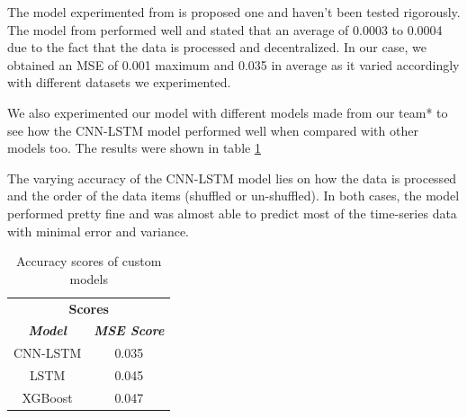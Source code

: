 \documentclass[conference]{IEEEtran}
\begin{document}
The model experimented from \cite{b3} is proposed one and haven't been tested rigorously. The model from \cite{b9} performed well and stated that an average of 0.0003 to 0.0004 due to the fact that the data is processed and decentralized. In our case, we obtained an MSE of 0.001 maximum and 0.035 in average as it varied accordingly with different datasets we experimented.

We also experimented our model with different models made from our team* to see how the CNN-LSTM model performed well when compared with other models too. The results were shown in table \ref{tab2}

The varying accuracy of the CNN-LSTM model lies on how the data is processed and the order of the data items (shuffled or un-shuffled). In both cases, the model performed pretty fine and was almost able to predict most of the time-series data with minimal error and variance.

\begin{table}[htbp]
	\caption{Accuracy scores of custom models}
	\begin{center}
		\begin{tabular}{|c|c|}
			\hline
			\multicolumn{2}{|c|}{\textbf{Scores}} \\
			\cline{1-2} 
			\textbf{\textit{Model}}& \textbf{\textit{MSE Score}} \\
			\hline
			CNN-LSTM & 0.035 \\
			\hline
			LSTM & 0.045 \\
			\hline
			XGBoost & 0.047 \\
			\hline
		\end{tabular}
		\label{tab2}
	\end{center}
\end{table}
\end{document}
